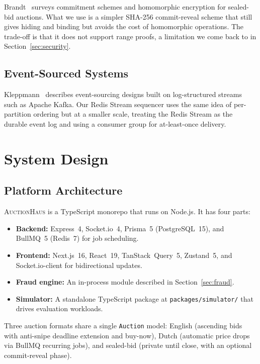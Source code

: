 \documentclass[conference]{IEEEtran}
\begin{document}
Brandt~\cite{Brandt2006} surveys commitment schemes and homomorphic
encryption for sealed-bid auctions. What we use is a simpler SHA-256
commit-reveal scheme that still gives hiding and binding but avoids the
cost of homomorphic operations. The trade-off is that it does not support
range proofs, a limitation we come back to in
Section~\ref{sec:security}.

\subsection{Event-Sourced Systems}

Kleppmann~\cite{Kleppmann2017} describes event-sourcing designs built on
log-structured streams such as Apache Kafka. Our Redis Stream sequencer
uses the same idea of per-partition ordering but at a smaller scale,
treating the Redis Stream as the durable event log and using a consumer
group for at-least-once delivery.

\section{System Design}

\subsection{Platform Architecture}

\textsc{AuctionHaus} is a TypeScript monorepo that runs on Node.js. It
has four parts:
\begin{itemize}
  \item \textbf{Backend:} Express~4, Socket.io~4, Prisma~5 (PostgreSQL~15),
    and BullMQ~5 (Redis~7) for job scheduling.
  \item \textbf{Frontend:} Next.js~16, React~19, TanStack~Query~5,
    Zustand~5, and Socket.io-client for bidirectional updates.
  \item \textbf{Fraud engine:} An in-process module described in
    Section~\ref{sec:fraud}.
  \item \textbf{Simulator:} A standalone TypeScript package at
    {\tt packages/simulator/} that drives evaluation workloads.
\end{itemize}

Three auction formats share a single {\tt Auction} model: English
(ascending bids with anti-snipe deadline extension and buy-now),
Dutch (automatic price drops via BullMQ recurring jobs), and
sealed-bid (private until close, with an optional commit-reveal phase).
\end{document}
